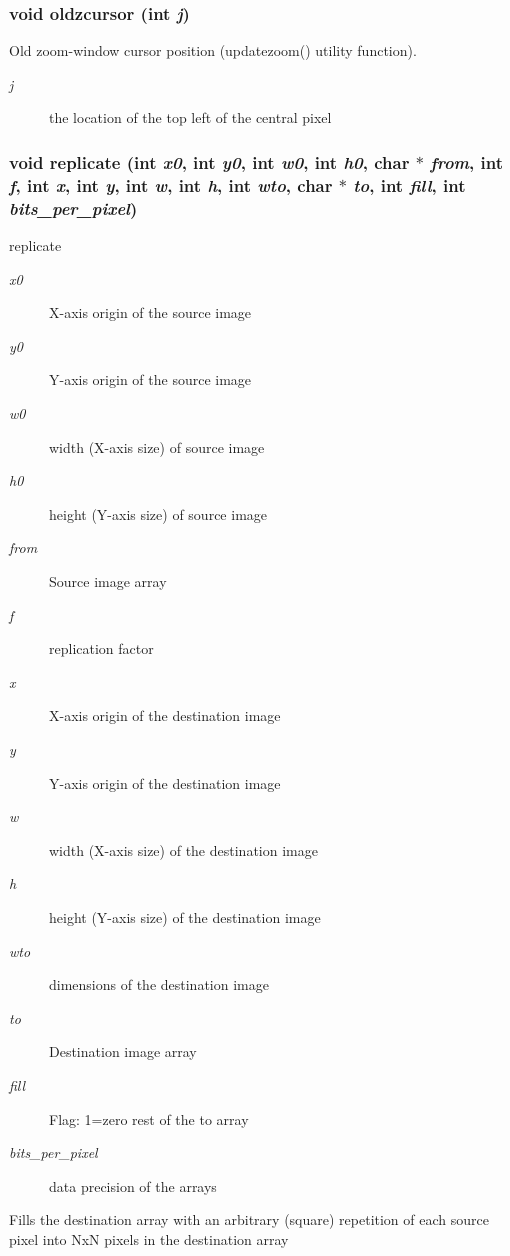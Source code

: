 \subsubsection{\setlength{\rightskip}{0pt plus 5cm}void oldzcursor (int {\em j})}\label{xtvutils_8c_a205}


Old zoom-window cursor position (updatezoom() utility function). 

\begin{Desc}
\item[Parameters:]
\begin{description}
\item[{\em j}]the location of the top left of the central pixel \end{description}
\end{Desc}
\subsubsection{\setlength{\rightskip}{0pt plus 5cm}void replicate (int {\em x0}, int {\em y0}, int {\em w0}, int {\em h0}, char $\ast$ {\em from}, int {\em f}, int {\em x}, int {\em y}, int {\em w}, int {\em h}, int {\em wto}, char $\ast$ {\em to}, int {\em fill}, int {\em bits\_\-per\_\-pixel})}\label{xtvutils_8c_a225}


replicate 

\begin{Desc}
\item[Parameters:]
\begin{description}
\item[{\em x0}]X-axis origin of the source image \item[{\em y0}]Y-axis origin of the source image \item[{\em w0}]width (X-axis size) of source image \item[{\em h0}]height (Y-axis size) of source image \item[{\em from}]Source image array \item[{\em f}]replication factor \item[{\em x}]X-axis origin of the destination image \item[{\em y}]Y-axis origin of the destination image \item[{\em w}]width (X-axis size) of the destination image \item[{\em h}]height (Y-axis size) of the destination image \item[{\em wto}]dimensions of the destination image \item[{\em to}]Destination image array \item[{\em fill}]Flag: 1=zero rest of the to array \item[{\em bits\_\-per\_\-pixel}]data precision of the arrays\end{description}
\end{Desc}
Fills the destination array with an arbitrary (square) repetition of each source pixel into Nx\-N pixels in the destination array

